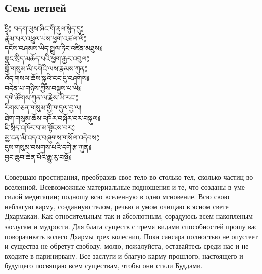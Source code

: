 \subsection{Семь ветвей}
\vspace{0.8cm}
\ti
ཧྲཱི༔ བདག་ལུས་ཞིང་གི་རྡུལ་སྙེད་དུ༔\\
རྣམ་པར་འཕྲུལ་པས་ཕྱག་འཚལ་ལོ༔\\
དངོས་བཤམས་ཡིད་སྤྲུལ་ཏིང་འཛིན་མཐུས༔\\
སྣང་སྲིད་མཆོད་པའི་ཕྱག་རྒྱར་འབུལ༔\\
སྒོ་གསུམ་མི་དགེའི་ལས་རྣམས་ཀུན༔\\
འོད་གསལ་ཆོས་སྐུའི་ངང་དུ་བཤགས༔\\
བདེན་པ་གཉིས་ཀྱིས་བསྡུས་པ་ཡི༔\\
དགེ་ཚོགས་ཀུན་ལ་རྗེས་ཡི་རང་༔\\
རིགས་ཅན་གསུམ་གྱི་གདུལ་བྱ་ལ།\\
ཐེག་གསུམ་ཆོས་འཁོར་བསྐོར་བར་བསྐུལ༔\\
ཇི་སྲིད་འཁོར་བ་མ་སྟོངས་བར༔ \\
མྱ་ངན་མི་འདའ་བཞུགས་གསོལ་འདེབས༔ \\
དུས་གསུམ་བསགས་པའི་དགེ་རྩ་ཀུན༔ \\
བྱང་ཆུབ་ཆེན་པོའི་རྒྱུ་རུ་བསྔོ༔ \\
\\
\ru
Совершаю простирания, преобразив свое тело во столько тел, сколько частиц во вселенной.
Всевозможные материаль\-ные подношения и те, что созданы в уме силой медитации;
подношу всю вселенную в одно мгновение.
Всю свою неблагую карму, созданную телом, речью и умом очищаю в ясном свете Дхармакаи.
Как относительным так и абсолютным, сорадуюсь всем накопленым заслугам и мудрости.
Для блага существ с тремя видами способностей прошу вас  поворачивать колесо Дхармы трех колесниц.
Пока сансара полностью не опустеет и существа не обретут свободу,
молю, пожалуйста, оставайтесь среди нас и не входите в паринирвану.
Все заслуги и благую карму прошлого, настоящего и будущего
посвящаю всем существам, чтобы они стали Буддами.
\newpage
